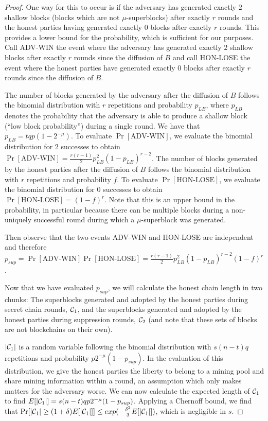 \begin{proof}
One way for this to occur is if the adversary has generated exactly $2$ shallow
blocks (blocks which are not $\mu$-superblocks) after exactly $r$ rounds and the
honest parties having generated exactly $0$ blocks after exactly $r$ rounds.
This provides a lower bound for the probability, which is sufficient for our
purposes. Call ADV-WIN the event where the adversary has generated exactly $2$
shallow blocks after exactly $r$ rounds since the diffusion of $B$ and call
HON-LOSE the event where the honest parties have generated exactly $0$ blocks
after exactly $r$ rounds since the diffusion of $B$.

The number of blocks generated by the adversary after the diffusion of $B$
follows the binomial distribution with $r$ repetitions and probability $p_{LB}$,
where $p_{LB}$ denotes the probability that the adversary is able to produce a
shallow block (``low block probability'') during a single round. We have that
$p_{LB} = tqp(1 - 2^{-\mu})$. To evaluate $\Pr[\text{ADV-WIN}]$, we evaluate the
binomial distribution for $2$ successes to obtain $\Pr[\text{ADV-WIN}] =
\frac{r(r - 1)}{2} p_{LB}^2 (1 - p_{LB})^{r - 2}$. The number of blocks
generated by the honest parties after the diffusion of $B$ follows the binomial
distribution with $r$ repetitions and probability $f$. To evaluate
$\Pr[\text{HON-LOSE}]$, we evaluate the binomial distribution for $0$ successes
to obtain $\Pr[\text{HON-LOSE}] = (1 - f)^r$. Note that this is an upper bound
in the probability, in particular because there can be multiple
blocks during a non-uniquely successful round during which a $\mu$-superblock
was generated.

Then observe that the two events ADV-WIN and HON-LOSE are independent and
therefore
$p_{sup} =
 \Pr[\text{ADV-WIN}]\Pr[\text{HON-LOSE}] =
 \frac{r(r - 1)}{2} p_{LB}^2 (1 - p_{LB})^{r - 2}(1 - f)^r$.

Now that we have evaluated $p_{sup}$,  we will calculate the honest chain length
in two chunks: The superblocks generated and adopted by the honest parties
during secret chain rounds, $\mathcal{C}_1$, and the superblocks generated and
adopted by the honest parties during suppression rounds, $\mathcal{C}_2$ (and note
that these sets of blocks are not blockchains on their own).

$|\mathcal{C}_1|$ is a random variable following the binomial distribution with
$s(n - t)q$ repetitions and probability $p2^{-\mu}(1 - p_{sup})$. In the
evaluation of this distribution, we give the honest parties the liberty to
belong to a mining pool and share mining information within a round, an
assumption which only makes matters for the adversary worse. We can now
calculate the expected length of $\mathcal{C}_1$ to find
$E[|\mathcal{C}_1|] = s(n - t)qp2^{-\mu}(1 - p_{sup})$. Applying a Chernoff bound, we
find that
$\Pr[|\mathcal{C}_1| \geq (1 + \delta)E[|\mathcal{C}_1|]]
\leq exp(-\frac{\delta^2}{3}E[|\mathcal{C}_1|])$, which is negligible in $s$.


\end{proof}
